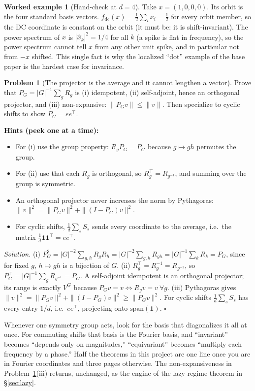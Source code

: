 \documentclass[11pt]{article}
\theoremstyle{plain}
\theoremstyle{definition}
\newtheorem{example}[theorem]{Worked example}
\newtheorem{problem}{Problem}[section]
\theoremstyle{remark}
\newenvironment{hints}{\par\smallskip\noindent\textbf{\color{hintc}Hints (peek one at a time):}\begin{itemize}}{\end{itemize}\par\smallskip}
\newenvironment{solution}{\par\smallskip\noindent\textit{Solution.}\;}{\hfill$\square$\par\smallskip}
\newcommand{\researchmove}[2]{\par\smallskip\noindent{\color{movec}\rule{\linewidth}{0.4pt}}\par\nobreak
  \noindent{\color{movec}\textbf{Research move: #1}}\par\nobreak\noindent #2\par
  \noindent{\color{movec}\rule{\linewidth}{0.4pt}}\par\smallskip}
\newcommand{\fdc}{f_{\mathrm{dc}}}
\newcommand{\one}{\mathbf 1}
\begin{document}
\begin{example}[Hand-check at $d=4$]
Take $x=(1,0,0,0)$. Its orbit is the four standard basis vectors. $\fdc(x)=\tfrac12\sum_i x_i=\tfrac12$ for every
orbit member, so the DC coordinate is constant on the orbit (it must be: it is shift-invariant). The power spectrum
of $x$ is $|\hat x_k|^2=1/4$ for all $k$ (a spike is flat in frequency), so the power spectrum cannot tell $x$ from
any other unit spike, and in particular not from $-x$ shifted. This single fact is why the localized ``dot'' example
of the base paper is the hardest case for invariance.
\end{example}

\begin{problem}[The projector is the average and it cannot lengthen a vector]\label{pr:proj}
Prove that $P_G=|G|^{-1}\sum_g R_g$ is (i) idempotent, (ii) self-adjoint, hence an orthogonal projector, and (iii)
non-expansive: $\|P_Gv\|\le\|v\|$. Then specialize to cyclic shifts to show $P_G=ee^\top$.
\end{problem}
\begin{hints}
\item For (i) use the group property: $R_gP_G=P_G$ because $g\mapsto gh$ permutes the group.
\item For (ii) use that each $R_g$ is orthogonal, so $R_g^\top=R_{g^{-1}}$, and summing over the group is symmetric.
\item An orthogonal projector never increases the norm by Pythagoras: $\|v\|^2=\|P_Gv\|^2+\|(I-P_G)v\|^2$.
\item For cyclic shifts, $\frac1d\sum_s S_s$ sends every coordinate to the average, i.e.\ the matrix $\frac1d\one\one^\top=ee^\top$.
\end{hints}
\begin{solution}
(i) $P_G^2=|G|^{-2}\sum_{g,h}R_gR_h=|G|^{-2}\sum_{g,h}R_{gh}=|G|^{-1}\sum_k R_k=P_G$, since for fixed $g$, $h\mapsto gh$
is a bijection of $G$. (ii) $R_g^\top=R_g^{-1}=R_{g^{-1}}$, so $P_G^\top=|G|^{-1}\sum_g R_{g^{-1}}=P_G$. A self-adjoint
idempotent is an orthogonal projector; its range is exactly $V^G$ because $P_Gv=v\Leftrightarrow R_gv=v\ \forall g$.
(iii) Pythagoras gives $\|v\|^2=\|P_Gv\|^2+\|(I-P_G)v\|^2\ge\|P_Gv\|^2$. For cyclic shifts $\frac1d\sum_s S_s$ has
every entry $1/d$, i.e.\ $ee^\top$, projecting onto $\mathrm{span}(\one)$.
\end{solution}

\researchmove{Diagonalize the symmetry}{Whenever one symmetry group acts, look for the basis that diagonalizes it
all at once. For commuting shifts that basis is the Fourier basis, and ``invariant'' becomes ``depends only on
magnitudes,'' ``equivariant'' becomes ``multiply each frequency by a phase.'' Half the theorems in this project are
one line once you are in Fourier coordinates and three pages otherwise. The non-expansiveness in
Problem~\ref{pr:proj}(iii) returns, unchanged, as the engine of the lazy-regime theorem in \S\ref{sec:lazy}.}
\end{document}
